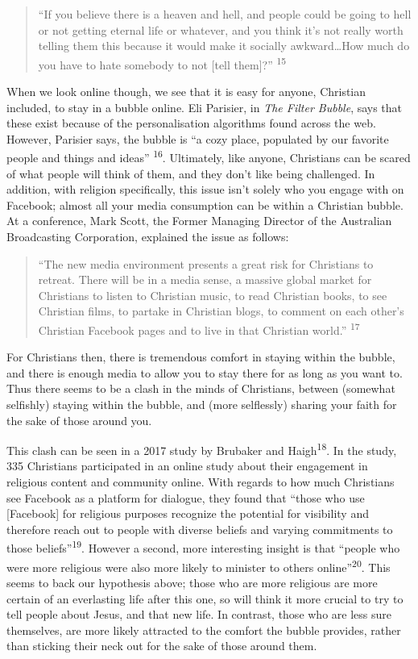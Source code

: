 \documentclass[]{article}
\begin{document}
\begin{quote}
``If you believe there is a heaven and hell, and people could be going
to hell or not getting eternal life or whatever, and you think it's not
really worth telling them this because it would make it socially
awkward\ldots{}How much do you have to hate somebody to not {[}tell
them{]}?'' \textsuperscript{15}
\end{quote}

When we look online though, we see that it is easy for anyone, Christian
included, to stay in a bubble online. Eli Parisier, in \emph{The Filter
Bubble}, says that these exist because of the personalisation algorithms
found across the web. However, Parisier says, the bubble is ``a cozy
place, populated by our favorite people and things and ideas''
\textsuperscript{16}. Ultimately, like anyone, Christians can be scared
of what people will think of them, and they don't like being challenged.
In addition, with religion specifically, this issue isn't solely who you
engage with on Facebook; almost all your media consumption can be within
a Christian bubble. At a conference, Mark Scott, the Former Managing
Director of the Australian Broadcasting Corporation, explained the issue
as follows:

\begin{quote}
``The new media environment presents a great risk for Christians to
retreat. There will be in a media sense, a massive global market for
Christians to listen to Christian music, to read Christian books, to see
Christian films, to partake in Christian blogs, to comment on each
other's Christian Facebook pages and to live in that Christian world.''
\textsuperscript{17}
\end{quote}

For Christians then, there is tremendous comfort in staying within the
bubble, and there is enough media to allow you to stay there for as long
as you want to. Thus there seems to be a clash in the minds of
Christians, between (somewhat selfishly) staying within the bubble, and
(more selflessly) sharing your faith for the sake of those around you.

This clash can be seen in a 2017 study by Brubaker and
Haigh\textsuperscript{18}. In the study, 335 Christians participated in
an online study about their engagement in religious content and
community online. With regards to how much Christians see Facebook as a
platform for dialogue, they found that ``those who use {[}Facebook{]}
for religious purposes recognize the potential for visibility and
therefore reach out to people with diverse beliefs and varying
commitments to those beliefs''\textsuperscript{19}. However a second,
more interesting insight is that ``people who were more religious were
also more likely to minister to others online''\textsuperscript{20}.
This seems to back our hypothesis above; those who are more religious
are more certain of an everlasting life after this one, so will think it
more crucial to try to tell people about Jesus, and that new life. In
contrast, those who are less sure themselves, are more likely attracted
to the comfort the bubble provides, rather than sticking their neck out
for the sake of those around them.
\end{document}
